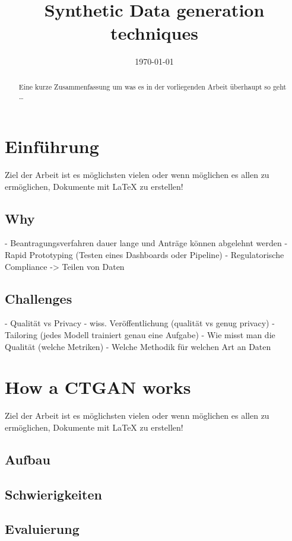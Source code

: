 \documentclass{article}
\title{Synthetic Data generation techniques}
\date{\today}
\begin{document}
\maketitle


\begin{abstract}
Eine kurze Zusammenfassung um was es in der vorliegenden Arbeit \"uberhaupt
so geht \ldots
\end{abstract}

\section{Einf\"uhrung}
Ziel der Arbeit ist es m\"oglichsten vielen oder wenn m\"oglichen es allen 
zu erm\"oglichen, Dokumente mit \LaTeX{} zu erstellen!

\subsection{Why}
- Beantragungsverfahren dauer lange und Anträge können abgelehnt werden
- Rapid Prototyping (Testen eines Dashboards oder Pipeline)
- Regulatorische Compliance -> Teilen von Daten

\subsection{Challenges}
- Qualität vs Privacy
- wiss. Veröffentlichung (qualität vs genug privacy)
- Tailoring (jedes Modell trainiert genau eine Aufgabe)
- Wie misst man die Qualität (welche Metriken)
- Welche Methodik für welchen Art an Daten

\section{How a CTGAN works}
Ziel der Arbeit ist es m\"oglichsten vielen oder wenn m\"oglichen es allen 
zu erm\"oglichen, Dokumente mit \LaTeX{} zu erstellen!

\subsection{Aufbau}
\subsection{Schwierigkeiten}
\subsection{Evaluierung}
\end{document}

